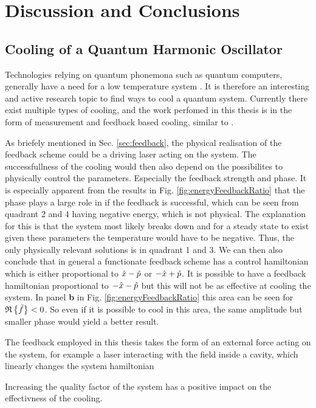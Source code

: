 \section{Discussion and Conclusions}

\subsection{Cooling of a Quantum Harmonic Oscillator}
Technologies relying on quantum phonemona such as quantum computers, generally have a need for a low temperature system \cite{Nielsen:2010}. It is therefore an interesting and active research topic to find ways to cool a quantum system. Currently there exist multiple types of cooling, and the work perfomed in this thesis is in the form of measurement and feedback based cooling, similar to \cite{De-Sousa:2025}.

As briefely mentioned in Sec. \ref{sec:feedback}, the physical realisation of the feedback scheme could be a driving laser acting on the system. The successfullness of the cooling would then also depend on the possibilites to physically control the parameters. Especially the feedback strength and phase. It is especially apparent from the results in Fig. \ref{fig:energyFeedbackRatio} that the phase plays a large role in if the feedback is successful, which can be seen from quadrant 2 and 4 having negative energy, which is not physical. The explanation for this is that the system most likely breaks down and for a steady state to exist given these parameters the temperature would have to be negative. Thus, the only physically relevant solutions is in quadrant 1 and 3. We can then also conclude that in general a functionate feedback scheme has a control hamiltonian which is either proportional to $\hat{x} - \hat{p}$ or $-\hat{x} + \hat{p}$. It is possible to have a feedback hamiltonian proportional to $-\hat{x} - \hat{p}$ but this will not be as effective at cooling the system. In panel \textbf{b} in Fig. \ref{fig:energyFeedbackRatio} this area can be seen for $\mathfrak{R}\left\{\tilde{f}\right\} < 0$. So even if it is possible to cool in this area, the same amplitude but smaller phase would yield a better result.

The feedback employed in this thesis takes the form of an external force acting on the system, for example a laser interacting with the field inside a cavity, which linearly changes the system hamiltonian

Increasing the quality factor of the system has a positive impact on the effectivness of the cooling.

